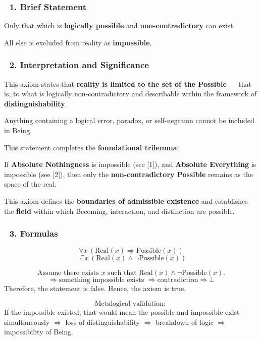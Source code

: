 \documentclass[12pt]{article}
\begin{document}
\subsubsection*{🔹 1. Brief Statement}
Only that which is \textbf{logically possible} and \textbf{non-contradictory} can exist.

All else is excluded from reality as \textbf{impossible}.

\subsubsection*{🔹 2. Interpretation and Significance}
This axiom states that \textbf{reality is limited to the set of the Possible} — that is, to what is logically non-contradictory and describable within the framework of \textbf{distinguishability}.

Anything containing a logical error, paradox, or self-negation cannot be included in Being.

This statement completes the \textbf{foundational trilemma}:

If \textbf{Absolute Nothingness} is impossible (see [1]), and \textbf{Absolute Everything} is impossible (see [2]), then only the \textbf{non-contradictory Possible} remains as the space of the real.

This axiom defines the \textbf{boundaries of admissible existence} and establishes the \textbf{field} within which Becoming, interaction, and distinction are possible.

\subsubsection*{🔹 3. Formulas}
\[
\forall x\,( \text{Real}(x) \Rightarrow \text{Possible}(x) )
\]
\[
\neg \exists x\,(\text{Real}(x) \wedge \neg \text{Possible}(x))
\]

\[
\text{Assume there exists } x \text{ such that } \text{Real}(x) \wedge \neg \text{Possible}(x).
\]
\[
\Rightarrow \text{something impossible exists } \Rightarrow \text{contradiction} \Rightarrow \bot
\]
Therefore, the statement is false. Hence, the axiom is true.

\[
\text{Metalogical validation: }
\]
If the impossible existed, that would mean the possible and impossible exist simultaneously 
$\Rightarrow$ loss of distinguishability 
$\Rightarrow$ breakdown of logic 
$\Rightarrow$ impossibility of Being.
\end{document}
